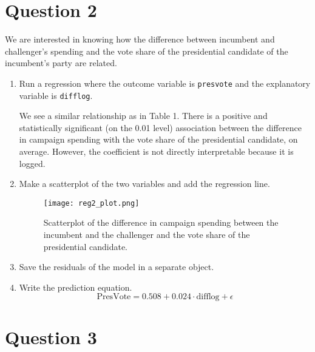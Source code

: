 \documentclass[12pt,letterpaper]{article}
\begin{document}
\newpage

\section*{Question 2}
\noindent We are interested in knowing how the difference between incumbent and challenger's spending and the vote share of the presidential candidate of the incumbent's party are related.	\vspace{.25cm}
	\begin{enumerate}
		\item Run a regression where the outcome variable is \texttt{presvote} and the explanatory variable is \texttt{difflog}.	
		
		We see a similar relationship as in Table 1. There is a positive and statistically significant (on the 0.01 level) association between the difference in campaign spending with the vote share of the presidential candidate, on average. However, the coefficient is not directly interpretable because it is logged. 
		
		
		
		
		\item Make a scatterplot of the two variables and add the regression line. 	
		
		
		
		\begin{figure}[H]
			\centering
			\texttt{[image: reg2\_plot.png]}
			\caption{Scatterplot of the difference in campaign spending between the incumbent and the challenger and the vote share of the presidential candidate.}
		\end{figure}		
		
		\item Save the residuals of the model in a separate object.
		
		
		\item Write the prediction equation.
		\begin{equation*}
			\text{PresVote} = 0.508 + 0.024 \cdot \text{difflog} + \epsilon
		\end{equation*}
		
	\end{enumerate}
	
	\newpage	
\section*{Question 3}
\end{document}
